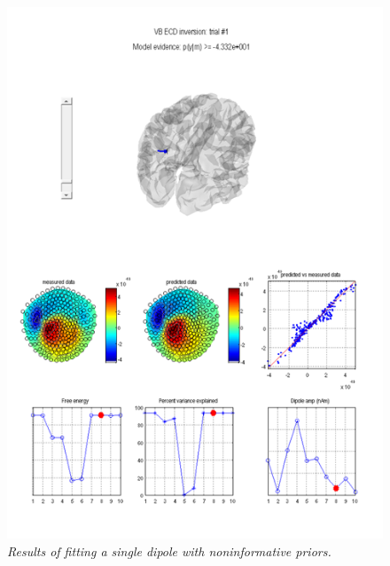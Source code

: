 \begin{figure}
\begin{center}
\includegraphics[width=140mm]{meg_sloc/slide15}
\caption{\em Results of fitting a single dipole with noninformative priors.\label{meg_sloc:fig:15}}
\end{center}
\end{figure}


